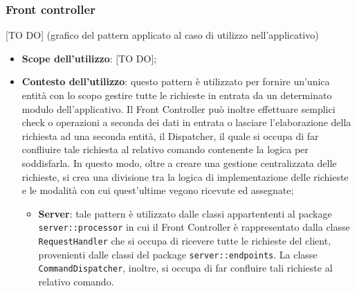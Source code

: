 	\subsubsection{Front controller} %
	\label{ssub:front_controller}
	[TO DO] (grafico del pattern applicato al caso di utilizzo nell'applicativo)
		\begin{itemize}
			\item \textbf{Scope dell'utilizzo}: [TO DO];
			\item \textbf{Contesto dell'utilizzo}: questo pattern è utilizzato per fornire un'unica entità con lo scopo gestire tutte le richieste in entrata da un determinato modulo dell'applicativo. Il Front Controller può inoltre effettuare semplici check o operazioni a seconda dei dati in entrata o lasciare l'elaborazione della richiesta ad una seconda entità, il Dispatcher, il quale si occupa di far confliuire tale richiesta al relativo comando contenente la logica per soddisfarla. In questo modo, oltre a creare una gestione centralizzata delle richieste, si crea una divisione tra la logica di implementazione delle richieste e le modalità con cui quest'ultime vegono ricevute ed assegnate;
				\begin{itemize}
					\item \textbf{Server}: tale pattern è utilizzato dalle classi appartententi al package \texttt{server::processor} in cui il Front Controller è rappresentato dalla classe \texttt{RequestHandler} che si occupa di ricevere tutte le richieste del client, provenienti dalle classi del package	\texttt{server::endpoints}. La classe \newline \texttt{CommandDispatcher}, inoltre, si occupa di far confluire tali richieste al relativo comando. \newline
				\end{itemize}
		\end{itemize}



